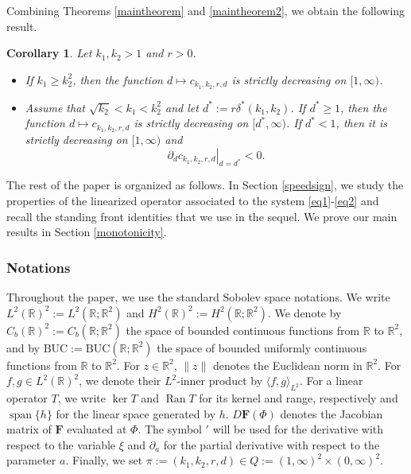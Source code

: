 \documentclass[11pt]{article}
\numberwithin{equation}{section}
\newcommand{\1}{\mathbbm{1}}
\numberwithin{equation}{section}
\newtheorem{corollary}[theorem]{Corollary}
\theoremstyle{definition}
\def \R {\mathbb{R}}
\def \F {\mathbf{F}}
\def \BUC{\mathrm{BUC}}
\numberwithin{equation}{section}
\begin{document}
Combining Theorems \ref{maintheorem} and \ref{maintheorem2}, we obtain the following result.
\begin{corollary}\label{corollarymonotonegeneral}
	Let $k_1,k_2>1$ and $r>0$. 
		\begin{itemize}
		\item[$(i)$] If $k_1\geq k_2^2$, then the function $d\mapsto c_{k_1,k_2,r,d}$ is strictly decreasing on $[1,\infty)$.
		\item[$(ii)$] Assume that $\sqrt{k_2}<k_1<k_2^2$ and let $d^*:=r\delta^*(k_1,k_2)$.		If $d^* \geq 1$, then the function $d\mapsto c_{k_1,k_2,r,d}$ is strictly decreasing on $[d^*,\infty)$. If $d^*<1$, then it is strictly decreasing on $[1,\infty)$ and
		\begin{equation*}
			\left.\partial_dc_{k_1,k_2,r,d}\right|_{d=d^*}<0.
		\end{equation*}
	\end{itemize}
\end{corollary}

The rest of the paper is organized as follows. In Section \ref{speedsign}, we study the properties of the linearized operator associated to the system \eqref{eq1}-\eqref{eq2} and recall the standing front identities that we use in the sequel.  We prove our main results in Section \ref{monotonicity}. 

\subsubsection*{Notations}Throughout the paper, we use the standard Sobolev space notations. We write $L^2(\R)^2:=L^2(\R;\R^2)$ and $H^2(\R)^2:=H^2(\R;\R^2)$. We denote by $C_b(\R)^2:=C_b(\R;\R^2)$ the space of bounded continuous functions from $\R$ to $\R^2$, and by $\BUC:=\BUC(\R;\R^2)$ the space of bounded uniformly continuous functions from $\R$ to $\R^2$.  For $z\in\R^2$, $\|z\|$ denotes the Euclidean norm in $\R^2$. For $f,g\in L^2(\R)^2$, we denote their $L^2$-inner product by $\langle f,g\rangle_{L^2}$.  For a linear operator $T$, we write $\ker T$ and $\operatorname{Ran}T$ for its kernel and range, respectively and $\operatorname{span}\{h\}$ for the linear space generated by $h$.  $D\F(\Phi)$ denotes the Jacobian matrix of $\F$ evaluated at $\Phi$. The symbol $'$ will be used for the derivative with respect to the variable $\xi$ and $\partial_{a}$ for the partial derivative with respect to the parameter $a$.  Finally, we set $\pi:=(k_1,k_2,r,d)\in Q:=(1,\infty)^2\times(0,\infty)^2$.

\end{document}
